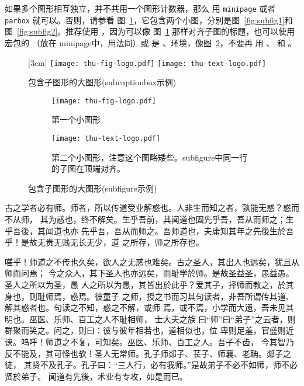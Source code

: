 如果多个图形相互独立，并不共用一个图形计数器，那么
用 \texttt{minipage} 或者\texttt{parbox} 就可以。否则，请参看
图~\ref{fig:big1-subcaptionbox}，它包含两个小图，分别是图~\ref{fig:subfig1}和
图~\ref{fig:subfig2}。推荐使用 ，因为可以像
图~\ref{fig:big1-subcaptionbox} 那样对齐子图的标题，也可以使用 
宏包的 （放在 minipage中，用法同）或
是  、环境，像图~\ref{fig:big1-subfigure}，不要再
用 、 和 。

\begin{figure}[h]
  \centering%
  [3cm] %
    {\texttt{[image: thu-fig-logo.pdf]}}%
  \hspace{4em}%
      {\texttt{[image: thu-text-logo.pdf]}}
  \caption{包含子图形的大图形(subcaptionbox示例)}
  \label{fig:big1-subcaptionbox}
\end{figure}
\begin{figure}[h]
  \centering%
  \begin{subfigure}{3cm}
    \texttt{[image: thu-fig-logo.pdf]}
    \caption{第一个小图形}
  \end{subfigure}%
  \hspace{4em}%
  \begin{subfigure}{0.5\textwidth}
    \texttt{[image: thu-text-logo.pdf]}
    \caption{第二个小图形，注意这个图略矮些。subfigure中同一行的子图在顶端对齐。}
  \end{subfigure}
  \caption{包含子图形的大图形(subfigure示例)}
  \label{fig:big1-subfigure}
\end{figure}

古之学者必有师。师者，所以传道受业解惑也。人非生而知之者，孰能无惑？惑而不从师，
其为惑也，终不解矣。生乎吾前，其闻道也固先乎吾，吾从而师之；生乎吾後，其闻道也亦
先乎吾，吾从而师之。吾师道也，夫庸知其年之先後生於吾乎！是故无贵无贱无长无少，道
之所存，师之所存也。

嗟乎！师道之不传也久矣，欲人之无惑也难矣。古之圣人，其出人也远矣，犹且从师而问焉；
今之众人，其下圣人也亦远矣，而耻学於师。是故圣益圣，愚益愚。圣人之所以为圣，愚
人之所以为愚，其皆出於此乎？爱其子，择师而教之，於其身也，则耻师焉，惑焉。彼童子
之师，授之书而习其句读者，非吾所谓传其道、解其惑者也。句读之不知，惑之不解，或师
焉，或不焉，小学而大遗，吾未见其明也。巫医、乐师、百工之人不耻相师，  士大夫之族
曰“师”曰“弟子”之云者，则群聚而笑之。问之，则曰：彼与彼年相若也，道相似也，位
卑则足羞，官盛则近谀。呜呼！师道之不复，可知矣。巫医、乐师、百工之人。吾子不齿，
今其智乃反不能及，其可怪也欤！圣人无常师。孔子师郯子、苌子、师襄、老聃。郯子之徒，
其贤不及孔子。孔子曰：“三人行，必有我师。”是故弟子不必不如师，师不必贤於弟子。
闻道有先後，术业有专攻，如是而已。

